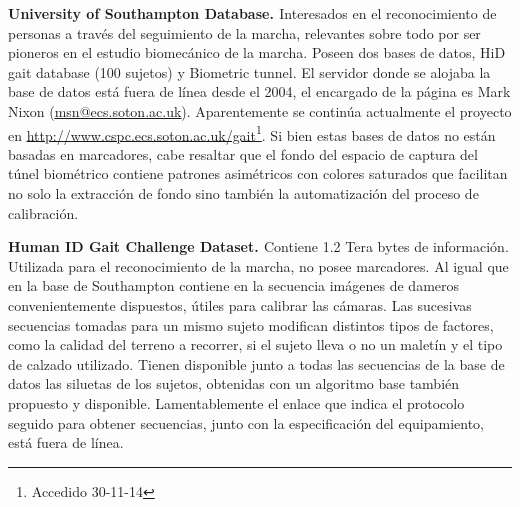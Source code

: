 \textbf{University of Southampton Database. \cite{US}} \label{USlab}
Interesados en el reconocimiento de personas a través del seguimiento de la marcha, relevantes sobre todo por ser pioneros en el estudio biomecánico de la marcha. Poseen dos bases de datos, HiD gait database  (100 sujetos) y Biometric tunnel. El servidor donde se alojaba la base de datos está fuera de línea desde el 2004, el encargado de la página es Mark Nixon (\textcolor{blue}{\underline{\url{msn@ecs.soton.ac.uk}}}). Aparentemente se continúa actualmente el proyecto en \textcolor{blue}{\underline{\url{http://www.cspc.ecs.soton.ac.uk/gait}}}\footnote{Accedido 30-11-14}. Si bien estas bases de datos no están basadas en marcadores, cabe resaltar que el fondo del espacio de captura del túnel biométrico contiene patrones asimétricos con colores saturados que facilitan no solo la extracción de fondo sino también la automatización del proceso de calibración.

\textbf{Human ID Gait Challenge Dataset. \cite{Human_ID}}
Contiene 1.2 Tera bytes de información. Utilizada para el reconocimiento de la marcha,  no posee marcadores. Al igual que en la base de Southampton contiene en la secuencia imágenes de dameros convenientemente dispuestos, útiles para calibrar las cámaras. Las sucesivas secuencias tomadas para un mismo sujeto modifican distintos tipos de factores, como la calidad del terreno a recorrer, si el sujeto lleva o no un maletín y el  tipo de calzado utilizado. Tienen disponible junto a todas las secuencias de la base de datos las siluetas de los sujetos, obtenidas con un algoritmo base también propuesto y disponible. Lamentablemente el enlace que indica el protocolo seguido para obtener secuencias, junto con la especificación del equipamiento, está fuera de línea.

